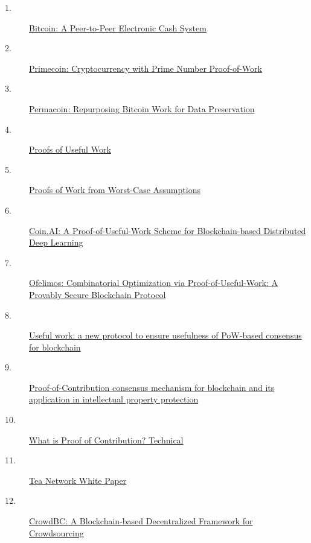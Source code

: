 \documentclass[12pt,a4paper]{article}
\begin{document}
\begin{description}
\item[1.] \href{https://bitcoin.org/bitcoin.pdf}{Bitcoin: A Peer-to-Peer Electronic Cash System}

\item[2.] \href{https://primecoin.io/primecoin-paper.pdf}{Primecoin: Cryptocurrency with Prime Number Proof-of-Work}

\item[3.] \href{https://www.microsoft.com/en-us/research/publication/permacoin-repurposing-bitcoin-work-for-data-preservation/}{Permacoin: Repurposing Bitcoin Work for Data Preservation}

\item[4.] \href{https://eprint.iacr.org/2017/203}{Proofs of Useful Work}

\item[5.] \href{https://doi.org/10.1007/978-3-319-96884-1_26}{Proofs of Work from Worst-Case Assumptions}

\item[6.] \href{https://doi.org/10.3390/app9245288}{Coin.AI: A Proof-of-Useful-Work Scheme for Blockchain-based Distributed Deep Learning}

\item[7.] \href{https://doi.org/10.1007/978-3-031-15979-4_12}{Ofelimos: Combinatorial Optimization via Proof-of-Useful-Work: A Provably Secure Blockchain Protocol}

\item[8.] \href{https://doi.org/10.1145/3524458.3547248}{Useful work: a new protocol to ensure usefulness of PoW-based consensus for blockchain}

\item[9.] \href{https://doi.org/10.1016/j.ipm.2021.102507}{Proof-of-Contribution consensus mechanism for blockchain and its application in intellectual property protection}

\item[10.] \href{https://docs.tea.xyz/tea/i-want-to.../learn-about-proof-of-contribution/what-is-proof-of-contribution-technical}{What is Proof of Contribution? Technical}

\item[11.] \href{https://github.com/teaxyz/white-paper/blob/main/white-paper.md}{Tea Network White Paper}

\item[12.] \href{https://eprint.iacr.org/2017/444}{CrowdBC: A Blockchain-based Decentralized Framework for Crowdsourcing}


\end{description}
\end{document}

